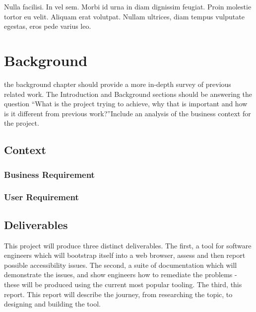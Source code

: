 \begin{savequote}[75mm]
Nulla facilisi. In vel sem. Morbi id urna in diam dignissim feugiat. Proin molestie tortor eu velit. Aliquam erat volutpat. Nullam ultrices, diam tempus vulputate egestas, eros pede varius leo.
\end{savequote}

\chapter{Background}

 the background chapter should provide a more in-depth survey of previous
related work.
The Introduction and Background sections should be answering the question
“What is the project trying to achieve, why that is important and how is it
different from previous work?”Include an analysis of the business context for
the project.


\section{Context}
\subsection{Business Requirement}

\subsection{User Requirement}

\section{Deliverables}
This project will produce three distinct deliverables. The first, a tool for software engineers which will bootstrap itself into a web
browser, assess and then report possible accessibility issues. The second, a suite of documentation which will demonstrate the issues, and
show engineers how to remediate the problems - these will be produced using the current most popular tooling. The third, this report. This
report will describe the journey, from researching the topic, to designing and building the tool.
